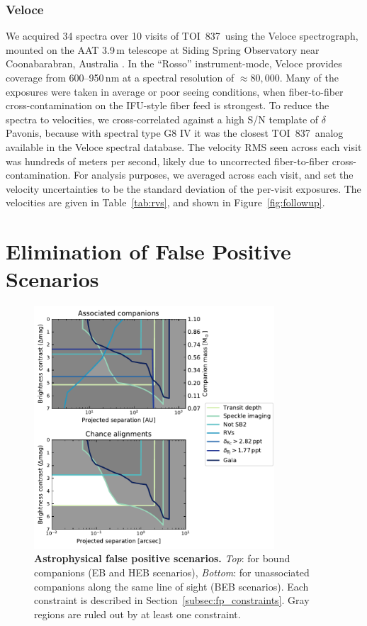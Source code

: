 \documentclass[12pt,twocolumn,tighten]{aastex63}
\newcommand{\tn}{TOI~837} %
\begin{document}
\subsubsection{Veloce}
We acquired 34 spectra over 10 visits of \tn\ using the Veloce
spectrograph, mounted on the AAT 3.9$\,$m telescope at Siding Spring
Observatory near Coonabarabran, Australia \citep{gilbert_veloce_2018}.
In the ``Rosso'' instrument-mode, Veloce provides coverage from
600--950$\,$nm at a spectral resolution of $\approx 80{,}000$.  Many
of the exposures were taken in average or poor seeing conditions, when
fiber-to-fiber cross-contamination on the IFU-style fiber feed is
strongest.  To reduce the spectra to velocities, we cross-correlated
against a high S/N template of $\delta$ Pavonis, because with spectral
type G8 IV it was the closest \tn\ analog available in the Veloce
spectral database.  The velocity RMS seen across each visit was
hundreds of meters per second, likely due to uncorrected
fiber-to-fiber cross-contamination.  For analysis purposes, we
averaged across each visit, and set the velocity uncertainties to be
the standard deviation of the per-visit exposures.  The velocities are
given in Table~\ref{tab:rvs}, and shown in Figure~\ref{fig:followup}.




\section{Elimination of False Positive Scenarios}
\label{sec:validation}

\begin{figure}[!t]
	\begin{center}
		\leavevmode
		\includegraphics[width=0.8\textwidth]{f4.pdf}
	\end{center}
	\vspace{-0.7cm}
	\caption{
    {\bf Astrophysical false positive scenarios.} {\it Top}: for bound
    companions (EB and HEB scenarios), {\it Bottom}: for unassociated
    companions along the same line of sight (BEB scenarios).  Each
    constraint is described in Section~\ref{subsec:fp_constraints}.
    Gray regions are ruled out by at least one constraint.
		\label{fig:fpscenario}
	}
\end{figure}
\end{document}
